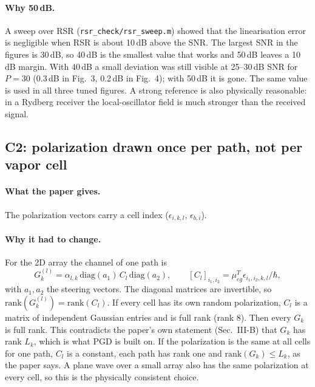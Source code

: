 \documentclass[11pt,a4paper]{article}
\newcommand{\file}[1]{\texttt{#1}}
\begin{document}
\paragraph{Why 50\,dB.}
A sweep over RSR (\file{rsr\_check/rsr\_sweep.m}) showed that the linearisation error is negligible
when RSR is about 10\,dB above the SNR. The largest SNR in the figures is 30\,dB, so 40\,dB is the
smallest value that works and 50\,dB leaves a 10\,dB margin. With 40\,dB a small deviation was
still visible at 25--30\,dB SNR for $P=30$ (0.3\,dB in Fig.~3, 0.2\,dB in Fig.~4); with 50\,dB it is
gone. The same value is used in all three tuned figures. A strong reference is also physically
reasonable: in a Rydberg receiver the local-oscillator field is much stronger than the received
signal.

\subsection{C2: polarization drawn once per path, not per vapor cell}
\label{sec:c2}

\paragraph{What the paper gives.} The polarization vectors carry a cell index
($\epsilon_{i,k,l}$, $\epsilon_{b,i}$).

\paragraph{Why it had to change.} For the 2D array the channel of one path is
\begin{equation}
G_k^{(l)}=\alpha_{l,k}\,\mathrm{diag}(a_1)\,C_l\,\mathrm{diag}(a_2),\qquad
[C_l]_{i_1,i_2}=\mu_{eg}^{T}\epsilon_{i_1,i_2,k,l}/\hbar ,
\end{equation}
with $a_1,a_2$ the steering vectors. The diagonal matrices are invertible, so
$\mathrm{rank}(G_k^{(l)})=\mathrm{rank}(C_l)$. If every cell has its own random polarization,
$C_l$ is a matrix of independent Gaussian entries and is full rank (rank 8). Then every $G_k$ is
full rank. This contradicts the paper's own statement (Sec.~III-B) that $G_k$ has rank $L_k$,
which is what PGD is built on. If the polarization is the same at all cells for one path, $C_l$
is a constant, each path has rank one and $\mathrm{rank}(G_k)\le L_k$, as the paper says. A plane
wave over a small array also has the same polarization at every cell, so this is the physically
consistent choice.
\end{document}
